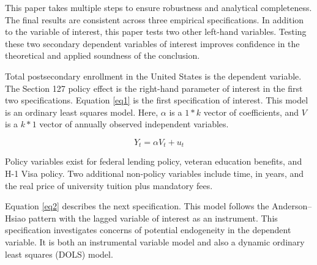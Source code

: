 \documentclass[review]{elsarticle}
\begin{document}
This paper takes multiple steps to ensure robustness and analytical completeness.
The final results are consistent across three empirical specifications.
In addition to the variable of interest, this paper tests two other left-hand variables.
Testing these two secondary dependent variables of interest improves confidence in the theoretical and applied soundness of the conclusion.

Total postsecondary enrollment in the United States is the dependent variable.
The Section 127 policy effect is the right-hand parameter of interest in the first two specifications.
Equation \ref{eq1} is the first specification of interest. This model is an ordinary least squares model.
Here, $\alpha$ is a $1*k$ vector of coefficients,
and $V$ is a $k*1$ vector of annually observed independent variables.

\begin{equation}
    Y_t = \alpha{V_{t}}+u_t
    \label{eq1}
\end{equation}

Policy variables exist for federal lending policy, veteran education benefits, and H-1 Visa policy.
Two additional non-policy variables include time, in years,
and the real price of university tuition plus mandatory fees.

Equation \ref{eq2} describes the next specification.
This model follows the Anderson–Hsiao pattern\cite{anderson1981estimation} with the lagged variable of interest as an instrument.
This specification investigates concerns of potential endogeneity in the dependent variable.
It is both an instrumental variable model and also a dynamic ordinary least squares (DOLS) model.
\end{document}
